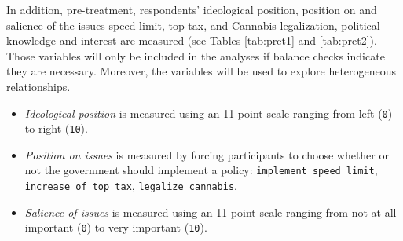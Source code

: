 \documentclass[]{article}
\begin{document}
In addition, pre-treatment, respondents' ideological position, position
on and salience of the issues speed limit, top tax, and Cannabis
legalization, political knowledge and interest are measured (see Tables
\ref{tab:pret1} and \ref{tab:pret2}). Those variables will only be
included in the analyses if balance checks indicate they are necessary.
Moreover, the variables will be used to explore heterogeneous
relationships.

\begin{itemize}
\item
  \emph{Ideological position} is measured using an 11-point scale
  ranging from left (\texttt{0}) to right (\texttt{10}).
\item
  \emph{Position on issues} is measured by forcing participants to
  choose whether or not the government should implement a policy:
  \texttt{implement\ speed\ limit}, \texttt{increase\ of\ top\ tax},
  \texttt{legalize\ cannabis}.
\item
  \emph{Salience of issues} is measured using an 11-point scale ranging
  from not at all important (\texttt{0}) to very important
  (\texttt{10}).
\end{itemize}
\end{document}
